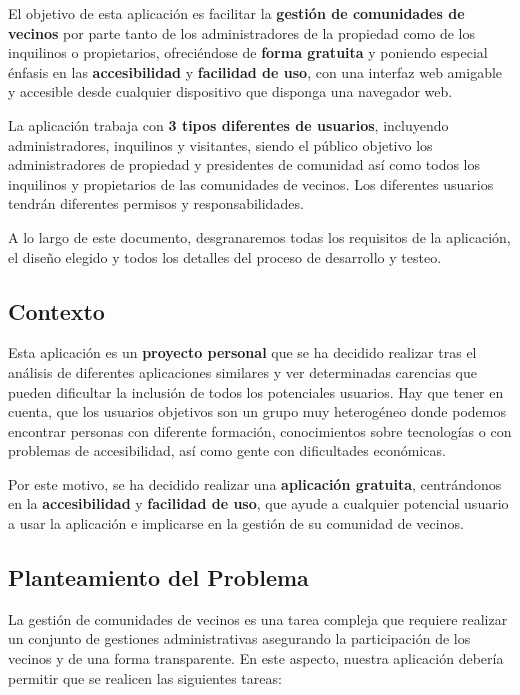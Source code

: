 El objetivo de esta aplicación es facilitar la \textbf{gestión de comunidades de vecinos} por parte tanto de los administradores de la propiedad como de los inquilinos o propietarios, ofreciéndose de \textbf{forma gratuita} y poniendo especial énfasis en las \textbf{accesibilidad} y \textbf{facilidad de uso}, con una interfaz web amigable y accesible desde cualquier dispositivo que disponga una navegador web.

La aplicación trabaja con \textbf{3 tipos diferentes de usuarios}, incluyendo administradores, inquilinos y visitantes, siendo el público objetivo los administradores de propiedad y presidentes de comunidad así como todos los inquilinos y propietarios de las comunidades de vecinos. Los diferentes usuarios tendrán diferentes permisos y responsabilidades.

A lo largo de este documento, desgranaremos todas los requisitos de la aplicación, el diseño elegido y todos los detalles del proceso de desarrollo y testeo.

\subsection{Contexto}
Esta aplicación es un \textbf{proyecto personal} que se ha decidido realizar tras el análisis de diferentes aplicaciones similares y ver determinadas carencias que pueden dificultar la inclusión de todos los potenciales usuarios. Hay que tener en cuenta, que los usuarios objetivos son un grupo muy heterogéneo donde podemos encontrar personas con diferente formación, conocimientos sobre tecnologías o con problemas de accesibilidad, así como gente con dificultades económicas.

Por este motivo, se ha decidido realizar una \textbf{aplicación gratuita}, centrándonos en la \textbf{accesibilidad} y \textbf{facilidad de uso}, que ayude a cualquier potencial usuario a usar la aplicación e implicarse en la gestión de su comunidad de vecinos. 

\subsection{Planteamiento del Problema}
La gestión de comunidades de vecinos es una tarea compleja que requiere realizar un conjunto de gestiones administrativas asegurando la participación de los vecinos y de una forma transparente. En este aspecto, nuestra aplicación debería permitir que se realicen las siguientes tareas:

